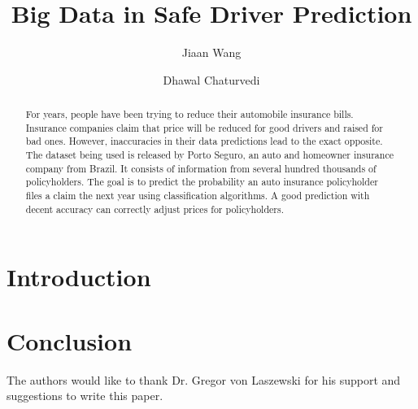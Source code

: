 \title{Big Data in Safe Driver Prediction}

\author{Jiaan Wang}

\author{Dhawal Chaturvedi}

\begin{abstract}

    For years, people have been trying to reduce their automobile
    insurance bills. Insurance companies claim that price will be
    reduced for good drivers and raised for bad ones. However,
    inaccuracies in their data predictions lead to the exact
    opposite. The dataset being used is released by Porto Seguro,
    an auto and homeowner insurance company from Brazil. It
    consists of information from several hundred thousands of
    policyholders. The goal is to predict the probability an auto
    insurance policyholder files a claim the next year using
    classification algorithms. A good prediction with decent
    accuracy can correctly adjust prices for policyholders.
    
\end{abstract}


\maketitle

\section{Introduction}


\section{Conclusion}


\begin{acks}

  The authors would like to thank Dr. Gregor von Laszewski for his
  support and suggestions to write this paper.

\end{acks}


 
